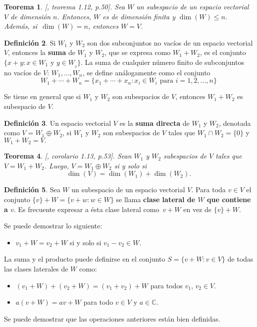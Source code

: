 \documentclass[12pt]{book}
\newtheorem{theorem}{Teorema}[section]
\theoremstyle{definition}
\newtheorem{definition}[theorem]{Definición}
\newcounter{in}
\newcounter{ini}
\begin{document}
\begin{theorem}{[\cite{friedberg1982algebra}, teorema 1.12, p.50]}.
  \label{esp-iguales}
  Sea $W$ un subespacio de un espacio vectorial $V$ de dimensión
  $n$. Entonces, $W$ es de dimensión finita y $\dim(W)\leq
  n$. Además, si~$\dim(W)=n$, entonces $W=V$.
\end{theorem}

\begin{definition}
  Si $W_{1}$ y $W_{2}$ son dos subconjuntos no vacíos de un espacio
  vectorial $V$, entonces la \textbf{suma} de $W_{1}$ y $W_{2}$, que se
  expresa como $W_{1}+W_{2}$, es el conjunto $\{x+y:x\in W_{1}$ y $y\in
  W_{_2}\}$. La suma de cualquier número finito de subconjuntos no
  vacíos de $V$: $W_{1},\ldots,W_{n}$, se define análogamente como el
  conjunto
  $$W_{1}+\cdots+W_{n}=\{x_{1}+\cdots+x_{n}: x_{i}\in W_{i} \mbox{ para }i=1,2,\ldots,n\}$$
\end{definition}

Se tiene en general que si $W_{1}$ y $W_{2}$ son subespacios de $V$,
entonces $W_{1}+W_{2}$ es subespacio de $V$.

\begin{definition}
  \label{suma-directa}
  Un espacio vectorial $V$ es la \textbf{suma directa} de $W_{1}$ y
  $W_{2}$, denotada como $V=W_{1}\oplus W_{2}$, si $W_{1}$ y $W_{2}$
  son subespacios de $V$ tales que $W_{1}\cap W_{2}=\{0\}$ y
  $W_{1}+W_{2}=V.$ 
\end{definition}

\begin{theorem}{[\cite{friedberg1982algebra}, corolario 1.13, p.53]}.
  Sean $W_{1}$ y $W_{2}$ subespacios de $V$ tales que
  $V=W_{1}+W_{2}$. Luego, $V=W_{1}\oplus W_{2}$ si y solo si 
  $$\dim(V)=\dim(W_{1})+\dim(W_{2}).$$
\end{theorem}

\begin{definition}
  Sea $W$ un subespacio de un espacio vectorial $V$. Para toda $v\in V$ el conjunto $\{v\}+W=\{v+w:w\in W\}$ se
  llama \textbf{clase lateral de $W$ que contiene a $v$}. Es frecuente
  expresar a ésta clase lateral como~$v+W$ en vez de $\{v\}+W$. 
\end{definition}

Se puede demostrar lo siguiente:
\begin{itemize}
\item $v_{1}+W=v_{2}+W$ si y solo si $v_{1}-v_{2}\in W.$
\end{itemize}
La suma y el producto puede definirse en el conjunto $S=\{v+W:v\in
V\}$ de todas las clases laterales de $W$ como: 
\begin{itemize}
\item $(v_{1}+W)+(v_{2}+W)=(v_{1}+v_{2})+W$ para todos $v_{1}$, $v_{2}\in V$.
\item $a(v+W)=av+W$ para todo $v\in V$ y $a\in \mathbb{C}$.
\end{itemize}
Se puede demostrar que las operaciones anteriores están bien definidas.
\end{document}
